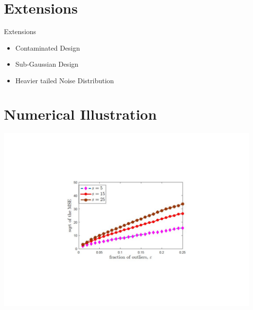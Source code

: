 \documentclass[unknownkeysallowed]{beamer}
\begin{document}
\section{Extensions}
\begin{frame}{Extensions}
	\begin{itemize}
		\item Contaminated Design
		\item Sub-Gaussian Design
		\item Heavier tailed Noise Distribution
	\end{itemize}
\end{frame}


\section{Numerical Illustration}


\begin{frame}
	\begin{center}
		\centering
		\includegraphics{numerical_illustration.pdf}
	\end{center}
	
\end{frame}




\end{document}

